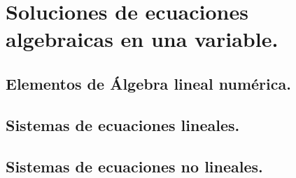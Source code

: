 \chapter{Soluciones de ecuaciones algebraicas en una variable.}

\section{Elementos de Álgebra lineal numérica.}

\section{Sistemas de ecuaciones lineales.}

\section{Sistemas de ecuaciones no lineales.}
